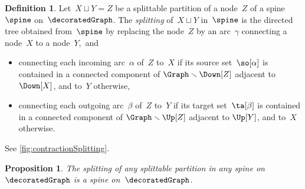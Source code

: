 \documentclass{amsart}
\newtheorem{proposition}[theorem]{Proposition}
\theoremstyle{definition}
\newtheorem{definition}[theorem]{Definition}
\newcommand{\ssm}{\smallsetminus} %
\newcommand{\darkblue}{\color{darkblue}} %
\newcommand{\defn}[1]{\textsl{\darkblue #1}} %
\begin{document}
\begin{definition}
  \label{def:nodeSplitting} 
  Let~$X \sqcup Y = Z$ be a splittable partition of a node~$Z$ of a spine~$\spine$ on~$\decoratedGraph$.
  The \defn{splitting} of~$X \sqcup Y$ in~$\spine$ is the directed tree obtained from~$\spine$ by replacing the node~$Z$ by an arc~$\gamma$ connecting a node~$X$ to a node~$Y$,~and
  \begin{itemize}
    \item connecting each incoming arc~$\alpha$ of~$Z$ to~$X$ if its source set~$\so[\alpha]$ is contained in a connected component of $\Graph \ssm \Down[Z]$ adjacent to $\Down[X]$, and to~$Y$ otherwise, 
    \item connecting each outgoing arc~$\beta$ of~$Z$ to~$Y$ if its target set~$\ta[\beta]$ is contained in a connected component of $\Graph \ssm \Up[Z]$ adjacent to $\Up[Y]$, and to~$X$ otherwise.
  \end{itemize}
  See \cref{fig:contractionSplitting}.
\end{definition}

\begin{proposition}
  \label{prop:nodeSplitting} 
  The splitting of any splittable partition in any spine on~$\decoratedGraph$ is a spine on~$\decoratedGraph$.
\end{proposition}
\end{document}
